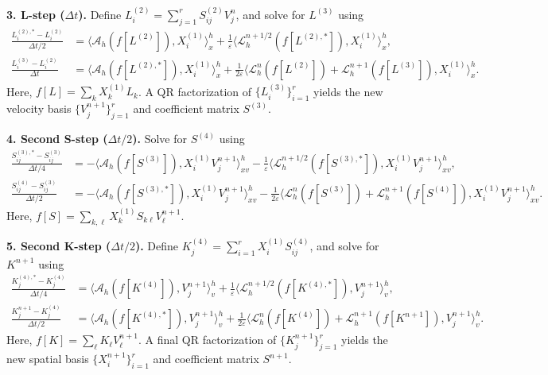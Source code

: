 \documentclass[]{article}
\numberwithin{equation}{section}
\begin{document}
\noindent\textbf{3. L-step ($\Delta t$).}
Define $L^{(2)}_i = \sum_{j=1}^r S^{(2)}_{ij} V^n_j$, and solve for $L^{(3)}$ using
\begin{align}
    \frac{L^{(2),\ast}_{i} - L^{(2)}_{i}}{\Delta t/2} &= \langle \mathcal{A}_h(f[L^{(2)}]),X^{(1)}_i\rangle_x^h + \frac{1}{\varepsilon}\langle \mathcal{L}_{h}^{n+1/2}(f[L^{(2),\ast}]),X^{(1)}_i\rangle_x^h, \\
    \frac{L^{(3)}_{i} - L^{(2)}_{i}}{\Delta t} &= \langle \mathcal{A}_h(f[L^{(2),\ast}]),X^{(1)}_i\rangle_x^h + \frac{1}{2\varepsilon}\langle \mathcal{L}_{h}^{n}(f[L^{(2)}]) + \mathcal{L}_{h}^{n+1}(f[L^{(3)}]),X^{(1)}_i\rangle_x^h.
\end{align}
Here, $f[L] = \sum_{k} X^{(1)}_k L_k$. A QR factorization of $\{L^{(3)}_i\}_{i=1}^{r}$ yields the new velocity basis $\{V^{n+1}_j\}_{j=1}^{r}$ and coefficient matrix $S^{(3)}$.

\noindent\textbf{4. Second S-step ($\Delta t/2$).}
Solve for $S^{(4)}$ using
\begin{align}
    \frac{S^{(3),\ast}_{ij} - S^{(3)}_{ij}}{\Delta t/4} &= - \big\langle \mathcal{A}_h(f[S^{(3)}]),X^{(1)}_i V^{n+1}_j \big\rangle_{xv}^h - \frac{1}{\varepsilon}\big\langle \mathcal{L}_{h}^{n+1/2}(f[S^{(3),\ast}]),X^{(1)}_i V^{n+1}_j \big\rangle_{xv}^h, \\
    \frac{S^{(4)}_{ij} - S^{(3)}_{ij}}{\Delta t/2} &= - \big\langle \mathcal{A}_h(f[S^{(3),\ast}]),X^{(1)}_i V^{n+1}_j \big\rangle_{xv}^h - \frac{1}{2\varepsilon}\big\langle \mathcal{L}_{h}^{n}(f[S^{(3)}]) + \mathcal{L}_{h}^{n+1}(f[S^{(4)}]),X^{(1)}_i V^{n+1}_j \big\rangle_{xv}^h.
\end{align}
Here, $f[S] = \sum_{k,\ell} X^{(1)}_k S_{k\ell} V^{n+1}_\ell$.

\noindent\textbf{5. Second K-step ($\Delta t/2$).}
Define $K^{(4)}_j = \sum_{i=1}^r X^{(1)}_i S^{(4)}_{ij}$, and solve for $K^{n+1}$ using
\begin{align}
    \frac{K^{(4),\ast}_{j} - K^{(4)}_{j}}{\Delta t/4} &= \langle \mathcal{A}_h(f[K^{(4)}]),V^{n+1}_j\rangle_v^h + \frac{1}{\varepsilon}\langle \mathcal{L}_{h}^{n+1/2}(f[K^{(4),\ast}]),V^{n+1}_j\rangle_v^h, \\
    \frac{K^{n+1}_{j} - K^{(4)}_{j}}{\Delta t/2} &= \langle \mathcal{A}_h(f[K^{(4),\ast}]),V^{n+1}_j\rangle_v^h + \frac{1}{2\varepsilon}\langle \mathcal{L}_{h}^{n}(f[K^{(4)}]) + \mathcal{L}_{h}^{n+1}(f[K^{n+1}]),V^{n+1}_j\rangle_v^h.
\end{align}
Here, $f[K] = \sum_{\ell} K_\ell V^{n+1}_\ell$. A final QR factorization of $\{K^{n+1}_j\}_{j=1}^{r}$ yields the new spatial basis $\{X^{n+1}_i\}_{i=1}^{r}$ and coefficient matrix $S^{n+1}$.
\end{document}
